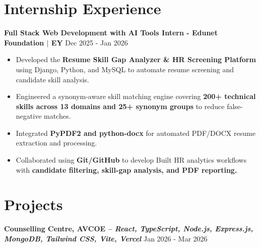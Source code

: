 \documentclass[a4paper,10pt]{article}
\begin{document}

\section*{Internship Experience}

\textbf{Full Stack Web Development with AI Tools Intern - Edunet Foundation $|$ EY}
\hfill Dec 2025 - Jan 2026
\begin{itemize}[leftmargin=*,itemsep=0pt]
\vspace{-10pt}
\item Developed the \textbf{Resume Skill Gap Analyzer \& HR Screening Platform} using Django, Python, and MySQL to automate resume screening and candidate skill analysis.
\vspace{-5pt}
\item Engineered a synonym-aware skill matching engine covering \textbf{200+ technical skills across 13 domains and 25+ synonym groups} to reduce false-negative matches.
\vspace{-5pt}
\item Integrated \textbf{PyPDF2 and python-docx} for automated PDF/DOCX resume extraction and processing.
\vspace{-5pt}
\item Collaborated using \textbf{Git/GitHub} to develop Built HR analytics workflows with \textbf{candidate filtering, skill-gap analysis, and PDF reporting.}
\end{itemize}


\section*{Projects}

\textbf{Counselling Centre, AVCOE -- \footnotesize{\textit{React, TypeScript, Node.js, Express.js, MongoDB, Tailwind CSS, Vite, Vercel}}}
\hfill Jan 2026 - Mar 2026
\vspace{-10pt}
\end{document}
